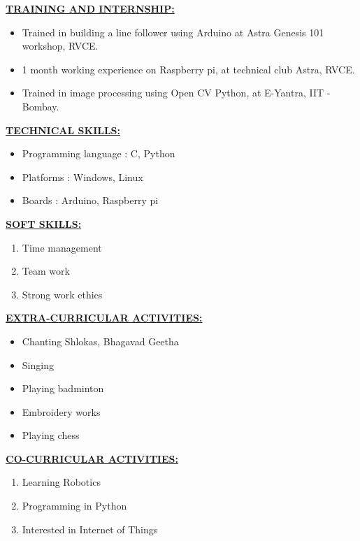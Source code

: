 \documentclass[letterpaper,11pt,oneside]{article}
\begin{document}
    \vspace{2ex}
    
    \textbf{\underline{\Large TRAINING AND INTERNSHIP:}}
    \begin{itemize}
    	\item Trained in building a line follower using Arduino at Astra Genesis 101 workshop, RVCE.
    	\item 1 month working experience on Raspberry pi, at technical club Astra, RVCE.
    	\item Trained in image processing using Open CV Python, at E-Yantra, IIT - Bombay.	
    \end{itemize}

\vspace{2ex}

\textbf{\underline{\Large TECHNICAL SKILLS:}} 
\begin{itemize}
	\item Programming language         :             C, Python
	\item Platforms                    :             Windows, Linux
	\item Boards                       :             Arduino, Raspberry pi 
\end{itemize}

\vspace{2ex}

\textbf{\underline{\Large SOFT SKILLS:}} 
\begin{enumerate}
	\item Time management
	\item Team work
	\item Strong work ethics
\end{enumerate}

\vspace{2ex}

\textbf{\underline{\Large EXTRA-CURRICULAR ACTIVITIES:}} 
\begin{itemize}
	\item Chanting Shlokas, Bhagavad Geetha
	\item Singing
	\item Playing badminton
	\item Embroidery works
	\item Playing chess
\end{itemize}

\vspace{2ex}

\textbf{\underline{\Large CO-CURRICULAR ACTIVITIES:}} 
\begin{enumerate}
	\item Learning Robotics
	\item Programming in Python
	\item Interested in Internet of Things
\end{enumerate}
\end{document}
